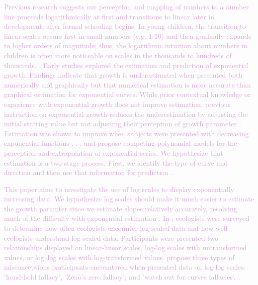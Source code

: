 \documentclass[]{interact}
\theoremstyle{plain}%
\theoremstyle{definition}
\theoremstyle{remark}
\begin{document}
\textcolor{Plum}{
Previous research suggests our perception and mapping of numbers to a number line proceeds logarithmically at first and transitions to linear later in development, after formal schooling begins.
In young children, the transition to linear scales occurs first in small numbers (e.g. 1-10) and then gradually expands to higher orders of magnitude; thus, the logarithmic intuition about numbers in children is often more noticeable on scales in the thousands to hundreds of thousands. \citep{varshney_why_2013, siegler_numerical_2017, dehaeneLogLinearDistinct2008}.
Early studies explored the estimation and prediction of exponential growth. 
Findings indicate that growth is underestimated when presented both numerically and graphically but that numerical estimation is more accurate than graphical estimation for exponential curves. 
While prior contextual knowledge or experience with exponential growth does not improve estimation, previous instruction on exponential growth reduces the underestimation by adjusting the initial starting value but not adjusting their perception of growth parameter
\citep{wagenaar_misperception_1975, jones_polynomial_1977}.
Estimation was shown to improve when subjects were presented with decreasing exponential functions \citep{timmers_inverse_1977}.
\cite{jones_polynomial_1977}, \cite{wagenaar_extrapolation_1978}, and \cite{jones_generalized_1979} propose competing polynomial models for the perception and extrapolation of exponential series.
We hypothesize that estimation is a two-stage process. First, we identify the type of curve and direction and then use that information for prediction \citep{best_perception_2007}.
}

\textcolor{Plum}{
This paper aims to investigate the use of log scales to display exponentially increasing data. We hypothesize log scales should make it much easier to estimate the growth paramter since we estimate slopes relatively accurately, resolving much of the difficulty with exponential estimation \citep{mosteller_eye_1981}.
In \cite{menge_logarithmic_2018}, ecologists were surveyed to determine how often ecologists encounter log-scaled data and how well ecologists understand log-scaled data. 
Participants were presented two relationships displayed on linear-linear scales, log-log scales with untransformed values, or log–log scales with log-transformed values. 
\cite{menge_logarithmic_2018} propose three types of misconceptions participants encountered when presented data on log-log scales: 'hand-hold fallacy', 'Zeno's zero fallacy', and 'watch out for curves fallacies'. 
}
\end{document}

